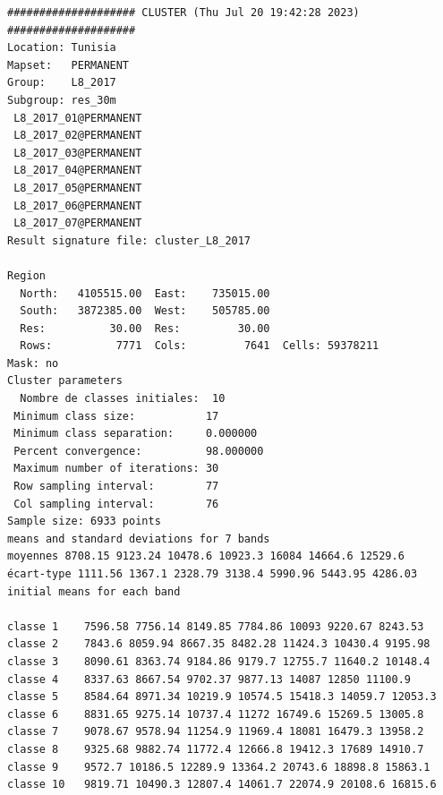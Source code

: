\documentclass[environments,article,submit,pdftex,moreauthors]{Definitions/mdpi}
\begin{document}
\begin{scriptsize}
\begin{verbatim}
#################### CLUSTER (Thu Jul 20 19:42:28 2023) ####################
Location: Tunisia
Mapset:   PERMANENT
Group:    L8_2017
Subgroup: res_30m
 L8_2017_01@PERMANENT
 L8_2017_02@PERMANENT
 L8_2017_03@PERMANENT
 L8_2017_04@PERMANENT
 L8_2017_05@PERMANENT
 L8_2017_06@PERMANENT
 L8_2017_07@PERMANENT
Result signature file: cluster_L8_2017

Region
  North:   4105515.00  East:    735015.00
  South:   3872385.00  West:    505785.00
  Res:          30.00  Res:         30.00
  Rows:          7771  Cols:         7641  Cells: 59378211
Mask: no
Cluster parameters
  Nombre de classes initiales: 	10
 Minimum class size:           17
 Minimum class separation:     0.000000
 Percent convergence:          98.000000
 Maximum number of iterations: 30
 Row sampling interval:        77
 Col sampling interval:        76
Sample size: 6933 points
means and standard deviations for 7 bands
moyennes 8708.15 9123.24 10478.6 10923.3 16084 14664.6 12529.6
écart-type 1111.56 1367.1 2328.79 3138.4 5990.96 5443.95 4286.03
initial means for each band

classe 1    7596.58 7756.14 8149.85 7784.86 10093 9220.67 8243.53
classe 2    7843.6 8059.94 8667.35 8482.28 11424.3 10430.4 9195.98
classe 3    8090.61 8363.74 9184.86 9179.7 12755.7 11640.2 10148.4
classe 4    8337.63 8667.54 9702.37 9877.13 14087 12850 11100.9
classe 5    8584.64 8971.34 10219.9 10574.5 15418.3 14059.7 12053.3
classe 6    8831.65 9275.14 10737.4 11272 16749.6 15269.5 13005.8
classe 7    9078.67 9578.94 11254.9 11969.4 18081 16479.3 13958.2
classe 8    9325.68 9882.74 11772.4 12666.8 19412.3 17689 14910.7
classe 9    9572.7 10186.5 12289.9 13364.2 20743.6 18898.8 15863.1
classe 10   9819.71 10490.3 12807.4 14061.7 22074.9 20108.6 16815.6


\end{verbatim}
\end{scriptsize}
\end{document}
